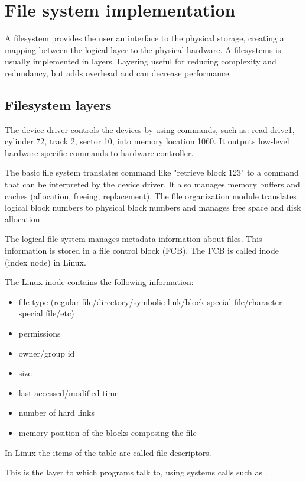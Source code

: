 \section{File system implementation}
A filesystem provides the user  an interface to the physical storage, creating a mapping between the logical layer to the physical hardware. A filesystems is usually implemented in layers. Layering useful for reducing complexity and redundancy, but adds overhead and can decrease performance.


\subsection{Filesystem layers}
The device driver controls the devices by using commands, such as: read drive1, cylinder 72, track 2, sector 10, into memory location 1060. It outputs low-level hardware specific commands to hardware
controller.

The basic file system translates command like "retrieve block 123" to a command that can be interpreted by the device driver. It also manages memory buffers and caches (allocation, freeing, replacement). The file organization module translates logical block numbers to physical block numbers and manages free space and disk allocation. 

The logical file system manages metadata information about files. This information is stored in a file control block (FCB). The FCB is called inode (index node) in Linux.

The Linux inode contains the following information:
\begin{itemize}
    \item file type (regular file/directory/symbolic link/block special file/character special file/etc)
    \item permissions
    \item owner/group id
    \item size
    \item last accessed/modified time
    \item number of hard links
    \item memory position of the blocks composing the file
\end{itemize}
In Linux the items of the table are called file descriptors.


This is the layer to which programs talk to, using systems calls such as .

